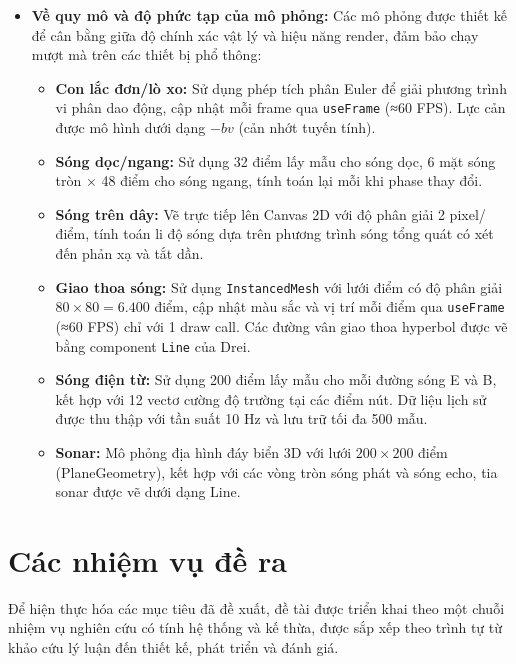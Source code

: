 \begin{itemize}
    \item \textbf{Về quy mô và độ phức tạp của mô phỏng:} Các mô phỏng được thiết kế để cân bằng giữa độ chính xác vật lý và hiệu năng render, đảm bảo chạy mượt mà trên các thiết bị phổ thông:
    \begin{itemize}
        \item \textbf{Con lắc đơn/lò xo:} Sử dụng phép tích phân Euler để giải phương trình vi phân dao động, cập nhật mỗi frame qua \texttt{useFrame} (≈60 FPS). Lực cản được mô hình dưới dạng $-bv$ (cản nhớt tuyến tính).
        \item \textbf{Sóng dọc/ngang:} Sử dụng 32 điểm lấy mẫu cho sóng dọc, 6 mặt sóng tròn × 48 điểm cho sóng ngang, tính toán lại mỗi khi phase thay đổi.
        \item \textbf{Sóng trên dây:} Vẽ trực tiếp lên Canvas 2D với độ phân giải 2 pixel/điểm, tính toán li độ sóng dựa trên phương trình sóng tổng quát có xét đến phản xạ và tắt dần.
        \item \textbf{Giao thoa sóng:} Sử dụng \texttt{InstancedMesh} với lưới điểm có độ phân giải $80 \times 80 = 6.400$ điểm, cập nhật màu sắc và vị trí mỗi điểm qua \texttt{useFrame} (≈60 FPS) chỉ với 1 draw call. Các đường vân giao thoa hyperbol được vẽ bằng component \texttt{Line} của Drei.
        \item \textbf{Sóng điện từ:} Sử dụng 200 điểm lấy mẫu cho mỗi đường sóng E và B, kết hợp với 12 vectơ cường độ trường tại các điểm nút. Dữ liệu lịch sử được thu thập với tần suất 10 Hz và lưu trữ tối đa 500 mẫu.
        \item \textbf{Sonar:} Mô phỏng địa hình đáy biển 3D với lưới $200 \times 200$ điểm (PlaneGeometry), kết hợp với các vòng tròn sóng phát và sóng echo, tia sonar được vẽ dưới dạng Line.
    \end{itemize}
\end{itemize}

\section{Các nhiệm vụ đề ra}
Để hiện thực hóa các mục tiêu đã đề xuất, đề tài được triển khai theo một chuỗi nhiệm vụ nghiên cứu có tính hệ thống và kế thừa, được sắp xếp theo trình tự từ khảo cứu lý luận đến thiết kế, phát triển và đánh giá.

